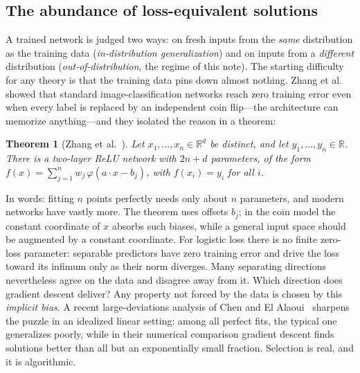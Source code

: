 \documentclass[11pt]{amsart}
\theoremstyle{plain}
\newtheorem{theorem}{Theorem}[section]
\theoremstyle{definition}
\begin{document}
\subsection{The abundance of loss-equivalent solutions}
A trained network is judged two ways: on fresh inputs from the \emph{same} distribution as the training data (\emph{in-distribution generalization}) and on inputs from a \emph{different} distribution (\emph{out-of-distribution}, the regime of this note). The starting difficulty for any theory is that the training data pins down almost nothing. Zhang et al.~\cite{zhang2017} showed that standard image-classification networks reach zero training error even when every label is replaced by an independent coin flip---the architecture can memorize anything---and they isolated the reason in a theorem:

\begin{theorem}[{Zhang et al.~\cite[Thm.~1]{zhang2017}}]\label{thm:zhang}
Let $x_1,\dots,x_n\in\mathbb R^d$ be distinct, and let $y_1,\dots,y_n\in\mathbb R$. There is a two-layer ReLU network with $2n+d$ parameters, of the form $f(x)=\sum_{j=1}^{n}w_j\,\varphi(a\cdot x - b_j)$, with $f(x_i)=y_i$ for all $i$.
\end{theorem}

In words: fitting $n$ points perfectly needs only about $n$ parameters, and modern networks have vastly more. The theorem uses offsets $b_j$; in the coin model the constant coordinate of $x$ absorbs such biases, while a general input space should be augmented by a constant coordinate. For logistic loss there is no finite zero-loss parameter: separable predictors have zero training error and drive the loss toward its infimum only as their norm diverges. Many separating directions nevertheless agree on the data and disagree away from it. Which direction does gradient descent deliver? Any property not forced by the data is chosen by this \emph{implicit bias}. A recent large-deviations analysis of Chen and El Alaoui~\cite{chen2026} sharpens the puzzle in an idealized linear setting: among all perfect fits, the typical one generalizes poorly, while in their numerical comparison gradient descent finds solutions better than all but an exponentially small fraction. Selection is real, and it is algorithmic.
\end{document}
